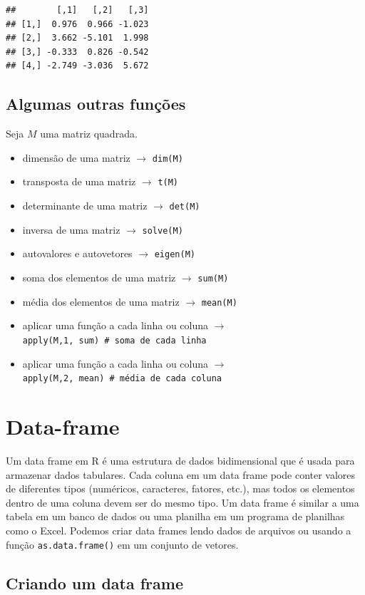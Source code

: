 \documentclass[
]{book}
\theoremstyle{definition}
\theoremstyle{definition}
\theoremstyle{definition}
\theoremstyle{definition}
\theoremstyle{remark}
\begin{document}
\begin{verbatim}
##        [,1]   [,2]   [,3]
## [1,]  0.976  0.966 -1.023
## [2,]  3.662 -5.101  1.998
## [3,] -0.333  0.826 -0.542
## [4,] -2.749 -3.036  5.672
\end{verbatim}

\section{Algumas outras funções}\label{algumas-outras-funuxe7uxf5es}

Seja \(M\) uma matriz quadrada.

\begin{itemize}
\item
  dimensão de uma matriz \(\to\) \texttt{dim(M)}
\item
  transposta de uma matriz \(\to\) \texttt{t(M)}
\item
  determinante de uma matriz \(\to\) \texttt{det(M)}
\item
  inversa de uma matriz \(\to\) \texttt{solve(M)}
\item
  autovalores e autovetores \(\to\) \texttt{eigen(M)}
\item
  soma dos elementos de uma matriz \(\to\) \texttt{sum(M)}
\item
  média dos elementos de uma matriz \(\to\) \texttt{mean(M)}
\item
  aplicar uma função a cada linha ou coluna \(\to\) \texttt{apply(M,1,\ sum)\ \#\ soma\ de\ cada\ linha}
\item
  aplicar uma função a cada linha ou coluna \(\to\) \texttt{apply(M,2,\ mean)\ \#\ média\ de\ cada\ coluna}
\end{itemize}

\chapter{Data-frame}\label{data-frame}

Um data frame em R é uma estrutura de dados bidimensional que é usada para armazenar dados tabulares. Cada coluna em um data frame pode conter valores de diferentes tipos (numéricos, caracteres, fatores, etc.), mas todos os elementos dentro de uma coluna devem ser do mesmo tipo. Um data frame é similar a uma tabela em um banco de dados ou uma planilha em um programa de planilhas como o Excel. Podemos criar data frames lendo dados de arquivos ou usando a função \texttt{as.data.frame()} em um conjunto de vetores.

\section{Criando um data frame}\label{criando-um-data-frame}
\end{document}
